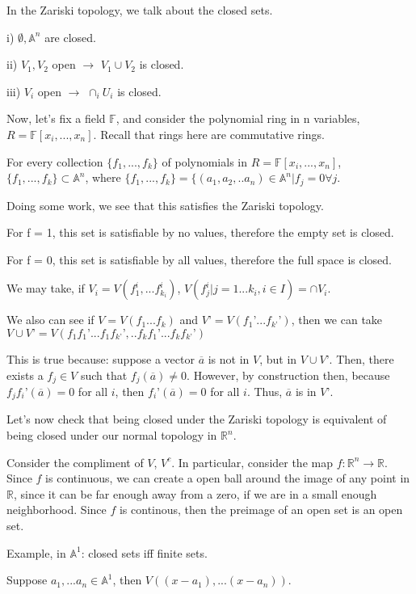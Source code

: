 \documentclass[10pt]{article}
\begin{document}
In the Zariski topology, we talk about the closed sets.

i) $\emptyset, \mathbb{A}^n$ are closed.

ii) $V_1, V_2$ open $\rightarrow$ $V_1 \cup V_2$ is closed.

iii) $V_i$ open $\rightarrow$ $\cap_i U_i$ is closed.

Now, let’s fix a field $\mathbb{F}$, and consider the polynomial ring in n variables, $R = \mathbb{F}[x_i,...,x_n]$. Recall that rings here are commutative rings.

For every collection $\{ f_1,...,f_k\}$ of polynomials in $R = \mathbb{F}[x_i,...,x_n]$, $\{ f_1,...,f_k\} \subset \mathbb{A}^n$, where $\{ f_1,...,f_k\} = \{(a_1, a_2,..a_n) \in \mathbb{A}^n | f_j = 0 \forall j$.

Doing some work, we see that this satisfies the Zariski topology.

For f = 1, this set is satisfiable by no values, therefore the empty set is closed.

For f = 0, this set is satisfiable by all values, therefore the full space is closed.

We may take, if $V_i = V(f_1^i,...f_{k_i}^i)$, $V( f_j^i | j = 1...k_i, i\in I) = \cap V_i$.

We also can see if $V = V(f_1...f_k)$ and $V’ = V(f_1’...f_{k’}’)$, then we can take $V \cup V’ = V(f_1f_1’...f_1f_{k’}’,..f_kf_1’...f_kf_{k’}’)$

This is true because: suppose a vector $\overline{a}$ is not in $V$, but in $V \cup V’$. Then, there exists a $f_j \in V$ such that $f_j(\overline{a}) \not = 0$. However, by construction then, because $f_jf_i’(\overline{a}) = 0$ for all $i$, then $f_i’(\overline{a}) = 0$ for all $i$. Thus, $\overline{a}$ is in $V’$.

Let’s now check that being closed under the Zariski topology is equivalent of being closed under our normal topology in $\mathbb{R}^n$.

Consider the compliment of $V$, $V^c$. In particular, consider the map $f: \mathbb{R}^n \rightarrow \mathbb{R}$. Since $f$ is continuous, we can create a open ball around the image of any point in $\mathbb{R}$, since it can be far enough away from a zero, if we are in a small enough neighborhood. Since $f$ is continous, then the preimage of an open set is an open set.

Example, in $\mathbb{A}^1$: closed sets iff finite sets.

Suppose $a_1,...a_n \in \mathbb{A}^1$, then $V((x-a_1),...(x-a_n))$.
\end{document}

